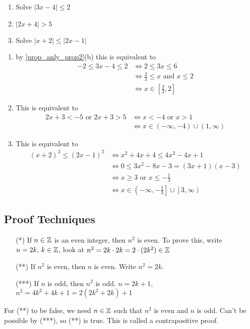 \documentclass[10pt, a4paper]{article}
\begin{document}
\begin{example}
    \begin{enumerate}[label = (\alph*)]
        \item Solve $|3x - 4| \leq 2$
        \item $|2x + 4| > 5$
        \item Solve $|x + 2| \leq |2x - 1|$
    \end{enumerate}
    
    \begin{enumerate}[label = (\alph*)]
    \item
    by \autoref{prop_anly_prop2}(b) this is equivalent to
    \begin{align*}
    -2 \leq 3x - 4 \leq 2 &\iff 2 \leq 3x \leq 6 \\
    &\iff \frac{2}{3} \leq x \text{ and } x \leq 2 \\
    &\iff x \in \left[\frac{2}{3}, 2\right]
    \end{align*}

    \item
    This is equivalent to
    \begin{align*}
        2x + 3 < -5\text{ or }2x + 3 > 5 &\iff x < -4 \text{ or } x > 1 \\
        &\iff x \in (-\infty, -4) \cup (1, \infty)
    \end{align*}

    \item
    This is equivalent to
    \begin{align*}
        (x + 2) ^ 2 \leq (2x - 1) ^ 2 &\iff x ^ 2 + 4x + 4 \leq 4x ^ 2 - 4x + 1 \\
        &\iff 0 \leq 3x ^ 2 - 8x - 3 = (3x + 1)(x - 3) \\
        &\iff x \geq 3 \text{ or } x \leq -\frac{1}{3} \\
        &\iff x \in \left(-\infty, -\frac{1}{3}\right] \cup \left[3, \infty\right)
    \end{align*}
    \end{enumerate}
\end{example}

\subsection{Proof Techniques}
\begin{itemize}[label = *]
    \item[(*)] If $n \in \mathbb{Z}$ is an even integer, then $n ^ 2$ is even. To prove this, write $n = 2k,\, k \in \mathbb{Z}$, look at $n ^ 2 = 2k \cdot 2k = 2 \cdot (2k ^ 2) \in \mathbb{Z}$
    \item[(**)] If $n ^ 2$ is even, then $n$ is even. Write $n ^ 2 = 2k$.
    \item[(***)] If $n$ is odd, then $n ^ 2$ is odd.
    $n = 2k + 1$, $n ^ 2 = 4k ^ 2 + 4k + 1 = 2(2k ^ 2 + 2k) + 1$
\end{itemize}
For (**) to be false, we need $n \in \mathbb{Z}$ such that $n ^ 2$ is even and $n$ is odd. Can't be possible by (***), so (**) is true. This is called a contrapositive proof.
\end{document}
